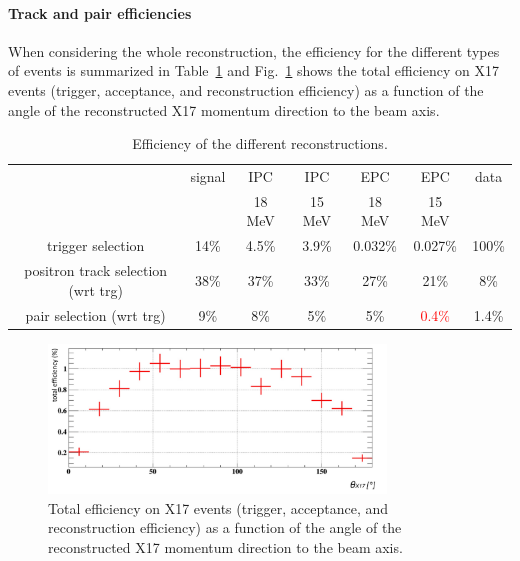 \begin{refsection}
        \paragraph{Track and pair efficiencies}
        When considering the whole reconstruction, the efficiency for the different types of events is summarized in Table~\ref{tab:X17:efficiency} and Fig.~\ref{fig:X17:totaleff} shows the total efficiency on X17 events (trigger, acceptance, and reconstruction efficiency) as a function of the angle of the reconstructed X17 momentum direction to the beam axis.
        
        \begin{table}[]
            \centering
            \begin{tabular}{|c|c|c|c|c|c|c|}
                 \hline
            &  signal & IPC        & IPC         & EPC      & EPC      & data   \\
            &   & 18 MeV        & 15 MeV         & 18 MeV      & 15 MeV   &    \\
             \hline
                 trigger selection  & 14\% & 4.5\%& 3.9\%&  0.032\% & 0.027\% &  100\%   \\      \hline
                  positron track selection (wrt trg)    & 38\%    & 37\%& 33\%&  27\%& 21\%& 8\%    \\      \hline
                        pair selection (wrt trg)          & 9\% & 8\%& 5\%&  5\% & \textcolor{red}{0.4\%}&   1.4\%  \\      \hline
                \end{tabular}
            \caption{Efficiency of the different reconstructions.}
            \label{tab:X17:efficiency}
        \end{table}

        \begin{figure}[]
            \centering
            \includegraphics[width=0.8\textwidth]{Figures/X17/Analysis/TotalEff.pdf}
            \caption{Total efficiency on X17 events (trigger, acceptance, and reconstruction efficiency) as a function of the angle of the reconstructed X17 momentum direction to the beam axis.}
            \label{fig:X17:totaleff}
        \end{figure}


\end{refsection}

